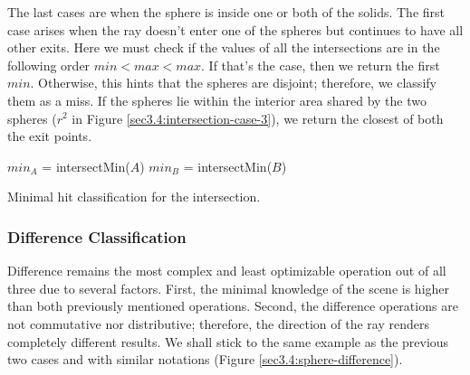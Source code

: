 \documentclass[a4paper,11pt,oneside]{article}
\begin{document}
The last cases are when the sphere is inside one or both of the solids. The first case arises when the ray doesn't enter one of the spheres but continues to have all other exits. Here we must check if the values of all the intersections are in the following order $min < max < max$. If that's the case, then we return the first $min$. Otherwise, this hints that the spheres are disjoint; therefore, we classify them as a miss. If the spheres lie within the interior area shared by the two spheres ($r^2$ in Figure \ref{sec3.4:intersection-case-3}), we return the closest of both the exit points.

\begin{algorithm}
	\SetAlgoLined
	$min_A$ = intersectMin($A$)\;
	$min_B$ = intersectMin($B$)\;
	\caption{Minimal hit classification for the intersection.}
	\label{sec3.4:intersection_algo}
\end{algorithm}

\subsubsection{Difference Classification}

Difference remains the most complex and least optimizable operation out of all three due to several factors. First, the minimal knowledge of the scene is higher than both previously mentioned operations. Second, the difference operations are not commutative nor distributive; therefore, the direction of the ray renders completely different results. We shall stick to the same example as the previous two cases and with similar notations (Figure \ref{sec3.4:sphere-difference}).
\end{document}
